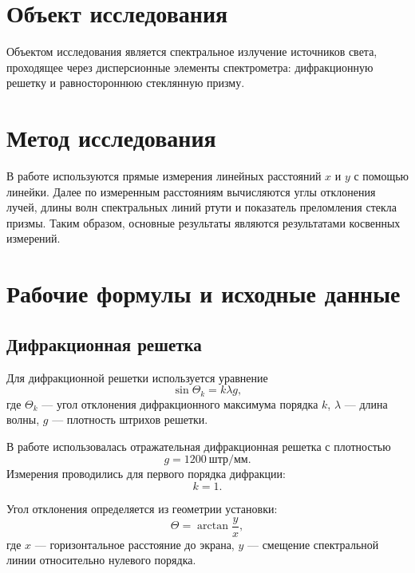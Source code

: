 \documentclass[a4paper,12pt]{article}
\begin{document}
\section{Объект исследования}

Объектом исследования является спектральное излучение источников света, проходящее через дисперсионные элементы спектрометра: дифракционную решетку и равностороннюю стеклянную призму.

\section{Метод исследования}

В работе используются прямые измерения линейных расстояний $x$ и $y$ с помощью линейки. Далее по измеренным расстояниям вычисляются углы отклонения лучей, длины волн спектральных линий ртути и показатель преломления стекла призмы. Таким образом, основные результаты являются результатами косвенных измерений.

\section{Рабочие формулы и исходные данные}

\subsection{Дифракционная решетка}

Для дифракционной решетки используется уравнение
\begin{equation}
    \sin\Theta_k = k\lambda g,
    \label{eq:grating}
\end{equation}
где $\Theta_k$ --- угол отклонения дифракционного максимума порядка $k$, $\lambda$ --- длина волны, $g$ --- плотность штрихов решетки.

В работе использовалась отражательная дифракционная решетка с плотностью
\begin{equation}
    g = 1200~\text{штр/мм}.
\end{equation}
Измерения проводились для первого порядка дифракции:
\begin{equation}
    k = 1.
\end{equation}

Угол отклонения определяется из геометрии установки:
\begin{equation}
    \Theta = \arctan\frac{y}{x},
    \label{eq:theta}
\end{equation}
где $x$ --- горизонтальное расстояние до экрана, $y$ --- смещение спектральной линии относительно нулевого порядка.
\end{document}
